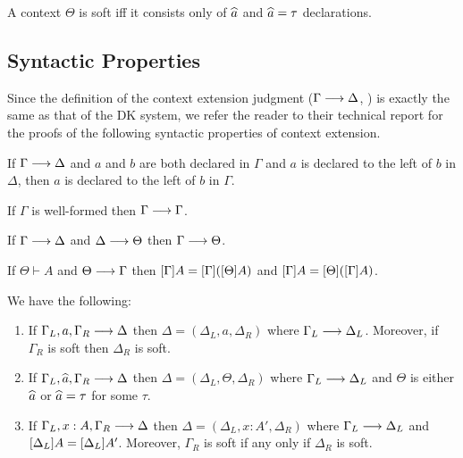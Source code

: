 \begin{mdef}[Softness]
  A context $\Theta$ is soft iff it consists only of $\widehat{a}$ and $\widehat{a} = \tau$ declarations.
\end{mdef}


\subsection{Syntactic Properties}

Since the definition of the context extension judgment ($\Gamma \longrightarrow \Delta$,
) is exactly the same as that of the DK system, we refer
the reader to their technical report for the proofs of the following syntactic
properties of context extension.


\begin{mlemma}
  If $\Gamma \longrightarrow \Delta$ and $a$ and $b$ are both declared in $\Gamma$ and $a$
  is declared to the left of $b$ in $\Delta$, then $a$ is declared to the left
  of $b$ in $\Gamma$.
  \label{lemma:reverse_preserve}
\end{mlemma}



\begin{mlemma}[Reflexivity]
  If $\Gamma$ is well-formed then $\Gamma \longrightarrow \Gamma$.
  \label{lemma:reflexivity}
\end{mlemma}


\begin{mlemma}[Transitivity]
  If $\Gamma \longrightarrow \Delta$ and $\Delta \longrightarrow \Theta$ then $\Gamma \longrightarrow \Theta$.
  \label{lemma:transitivity}
\end{mlemma}


\begin{mlemma}
  If $\Theta \vdash A$ and $\Theta \longrightarrow \Gamma$ then $[\Gamma]A =
  [\Gamma]([\Theta]A)$ and $[\Gamma]A = [\Theta]([\Gamma]A)$.
 \label{lemma:subst_ext_invar}
\end{mlemma}


\begin{mlemma} \label{lemma:extension_order}%
  We have the following:
  \begin{enumerate}
  \item If $\Gamma_L, a , \Gamma_R \longrightarrow \Delta$ then $\Delta = (\Delta_L, a, \Delta_R)$ where
    $\Gamma_L \longrightarrow \Delta_L$. Moreover, if $\Gamma_R$ is soft then $\Delta_R$ is soft.
  \item If $\Gamma_L, \widehat{a}, \Gamma_R \longrightarrow \Delta$ then $\Delta = (\Delta_L, \Theta, \Delta_R)$ where $\Gamma_L \longrightarrow \Delta_L$ and $\Theta$ is either $\widehat{a}$ or $\widehat{a} = \tau$ for some $\tau$.
  \item If $\Gamma_L , x : A, \Gamma_R \longrightarrow \Delta$ then $\Delta = (\Delta_L, x :
    A', \Delta_R)$ where $\Gamma_L \longrightarrow \Delta_L$ and $[\Delta_L]A =
    [\Delta_L]A'$. Moreover, $\Gamma_R$ is soft if any only if
    $\Delta_R$ is soft.
  \end{enumerate}
\end{mlemma}

